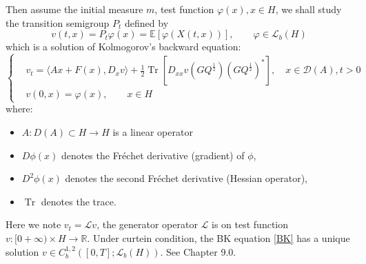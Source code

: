 Then assume the initial measure $m$, test function $\varphi(x), x\in H$, we shall study the transition semigroup $P_t$ defined by
\begin{equation}
    v(t, x) = P_t\varphi(x) = \mathbb{E}\left[\varphi(X(t, x))\right], \qquad \varphi\in \mathcal{L}_b(H)
\end{equation}
which is a solution of Kolmogorov's backward equation:
\begin{equation}\label{BK}
    \left\{\begin{aligned}
    &v_t = \langle Ax + F(x), D_xv\rangle + \frac{1}{2}\operatorname{Tr}\left[D_{xx}v\left(GQ^{\frac{1}{2}}\right)\left(GQ^{\frac{1}{2}}\right)^*\right],\quad x\in \mathcal{D}(A), t>0\\
    &v(0, x) = \varphi(x), \qquad x\in H
\end{aligned}\right.
\end{equation}
where:
\begin{itemize}
    \item $A: D(A)\subset H\rightarrow H$ is a linear operator
    \item \( D\phi(x) \) denotes the Fréchet derivative (gradient) of \( \phi \),
    \item \( D^2\phi(x) \) denotes the second Fréchet derivative (Hessian operator),
    \item \( \operatorname{Tr} \) denotes the trace.
\end{itemize} 
Here we note $v_t=\mathcal{L}v$, the generator operator $\mathcal{L}$ is on test function $v: [0+\infty)\times H \rightarrow \mathbb{R}$. 
Under curtein condition, the BK equation \ref{BK} has a unique solution $v\in C^{1, 2}_b([0, T]; \mathcal{L}_b(H))$.
See \cite{Prato_Zabczyk_2014} Chapter 9.0.

